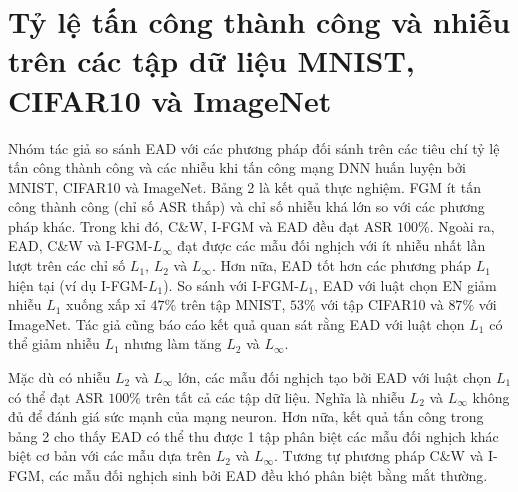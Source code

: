 \section{Tỷ lệ tấn công thành công và nhiễu trên các tập dữ liệu MNIST, CIFAR10 và ImageNet}
Nhóm tác giả so sánh EAD với các phương pháp đối sánh trên các tiêu chí tỷ lệ tấn công thành công và các nhiễu khi tấn công mạng DNN huấn luyện bởi MNIST, CIFAR10 và ImageNet. Bảng 2 là kết quả thực nghiệm. FGM ít tấn công thành công (chỉ số ASR thấp) và chỉ số nhiễu khá lớn so với các phương pháp khác. Trong khi đó, C\&W, I-FGM và EAD đều đạt ASR $100\%$. Ngoài ra, EAD, C\&W và I-FGM-$L_{\infty}$ đạt được các mẫu đối nghịch với ít nhiễu nhất lần lượt trên các chỉ số  $L_1$, $L_2$ và $L_{\infty}$. Hơn nữa, EAD tốt hơn các phương pháp $L_1$ hiện tại (ví dụ I-FGM-$L_1$). So sánh với I-FGM-$L_1$, EAD với luật chọn EN giảm nhiễu $L_1$ xuống xấp xỉ $47\%$ trên tập MNIST, $53\%$ với tập CIFAR10 và $87\%$ với ImageNet. Tác giả cũng báo cáo kết quả quan sát rằng EAD với luật chọn $L_1$ có thể giảm nhiễu $L_1$ nhưng làm tăng $L_2$ và $L_{\infty}$.



Mặc dù có nhiễu $L_2$ và $L_{\infty}$ lớn, các mẫu đối nghịch tạo bởi EAD với luật chọn $L_1$ có thể đạt ASR $100\%$ trên tất cả các tập dữ liệu. Nghĩa là nhiễu $L_2$ và $L_{\infty}$ không đủ để đánh giá sức mạnh của mạng neuron. Hơn nữa, kết quả tấn công trong bảng 2 cho thấy EAD có thể thu được 1 tập phân biệt các mẫu đối nghịch khác biệt cơ bản với các mẫu dựa trên $L_2$ và $L_{\infty}$. Tương tự phương pháp C\&W và I-FGM, các mẫu đối nghịch sinh bởi EAD đều khó phân biệt bằng mắt thường. 
